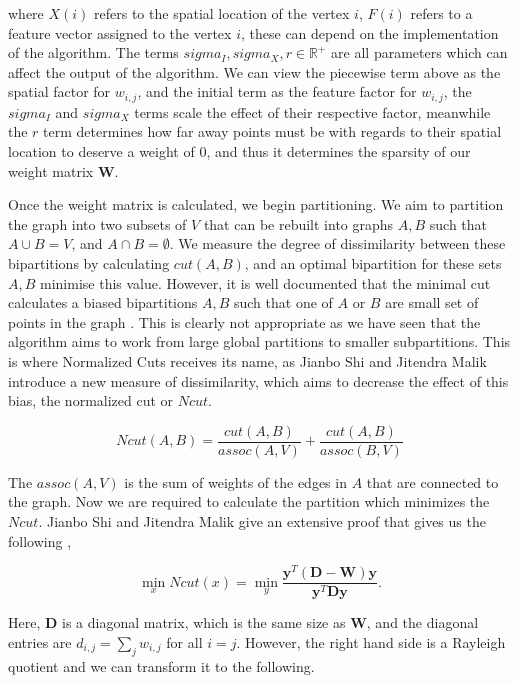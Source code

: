 \documentclass[11pt,openany]{book}
\begin{document}
where $X(i)$ refers to the spatial location of the vertex $i$, $F(i)$ refers to a feature vector assigned to the vertex $i$, these can depend on the implementation of the algorithm. The terms $sigma_I, sigma_X, r \in \mathbb{R}^{+}$ are all parameters which can affect the output of the algorithm. We can view the piecewise term above as the spatial factor for $w_{i,j}$, and the initial term as the feature factor for $w_{i,j}$, the $sigma_I$ and $sigma_X$ terms scale the effect of their respective factor, meanwhile the $r$ term determines how far away points must be with regards to their spatial location to deserve a weight of 0, and thus it determines the sparsity of our weight matrix $\mathbf{W}$.

Once the weight matrix is calculated, we begin partitioning. We aim to partition the graph into two subsets of $V$ that can be rebuilt into graphs $A,B$ such that $A \cup B = V$, and $A \cap B = \emptyset$. We measure the degree of dissimilarity between these bipartitions by calculating $cut(A,B)$, and an optimal bipartition for these sets $A,B$ minimise this value. However, it is well documented that the minimal cut calculates a biased bipartitions $A,B$ such that one of $A$ or $B$ are small set of points in the graph \cite{normalized_cuts_algorithm}. This is clearly not appropriate as we have seen that the algorithm aims to work from large global partitions to smaller subpartitions. This is where Normalized Cuts receives its name, as Jianbo Shi and Jitendra Malik introduce a new measure of dissimilarity, which aims to decrease the effect of this bias, the normalized cut or $Ncut$.

\begin{equation}
    Ncut(A,B) = \frac{cut(A,B)}{assoc(A,V)} + \frac{cut(A,B)}{assoc(B,V)}
    \label{equation:Ncut_equation}
\end{equation}

The $assoc(A,V)$ is the sum of weights of the edges in $A$ that are connected to the graph. Now we are required to calculate the partition which minimizes the $Ncut$. Jianbo Shi and Jitendra Malik give an extensive proof that gives us the following \cite{normalized_cuts_algorithm},

\begin{equation}
    \min_x Ncut(x) = \min_y \frac{ \mathbf{y}^T (\mathbf{D} - \mathbf{W}) \mathbf{y} }{ \mathbf{y}^T \mathbf{D y} }.
    \label{equation:n_cuts_to_raleigh_quotient}
\end{equation}

Here, $\mathbf{D}$ is a diagonal matrix, which is the same size as $\mathbf{W}$, and the diagonal entries are $d_{i,j} = \sum_j w_{i,j}$ for all $i=j$.  However, the right hand side is a Rayleigh quotient and we can transform it to the following.
\end{document}
